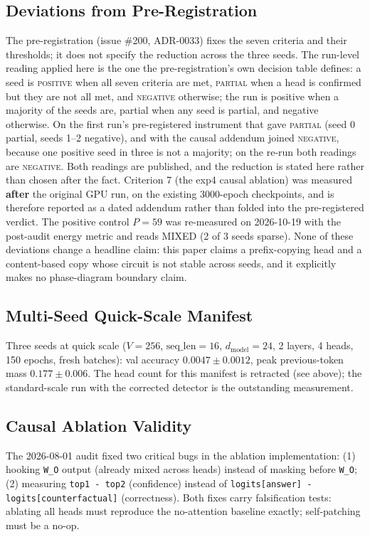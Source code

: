 \documentclass[11pt]{article}
\begin{document}
\subsection{Deviations from Pre-Registration}
The pre-registration (issue \#200, ADR-0033) fixes the seven criteria and
their thresholds; it does not specify the reduction across the three seeds.
The run-level reading applied here is the one the pre-registration's own
decision table defines: a seed is \textsc{positive} when all seven criteria
are met, \textsc{partial} when a head is confirmed but they are not all met,
and \textsc{negative} otherwise; the run is positive when a majority of the
seeds are, partial when any seed is partial, and negative otherwise. On the
first run's pre-registered instrument that gave \textsc{partial} (seed 0 partial, seeds
1--2 negative), and with the causal addendum joined \textsc{negative}, because one
positive seed in three is not a majority; on the re-run both readings are \textsc{negative}. Both readings are
published, and the reduction is stated here rather than chosen after the
fact. Criterion 7 (the exp4 causal ablation) was measured \textbf{after} the
original GPU run, on the existing $3000$-epoch checkpoints, and is therefore
reported as a dated addendum rather than folded into the pre-registered
verdict. The positive control $P=59$ was re-measured on 2026-10-19 with the
post-audit energy metric and reads MIXED (2 of 3 seeds sparse). None of these
deviations change a headline claim: this paper claims a prefix-copying head
and a content-based copy whose circuit is not stable across seeds, and it explicitly makes no
phase-diagram boundary claim.

\subsection{Multi-Seed Quick-Scale Manifest}
Three seeds at quick scale ($V=256$, $\text{seq\_len}=16$,
$d_\text{model}=24$, 2 layers, 4 heads, 150 epochs, fresh batches):
val accuracy $0.0047 \pm 0.0012$, peak previous-token mass
$0.177 \pm 0.006$. The head count for this manifest is retracted (see
above); the standard-scale run with the corrected detector is the
outstanding measurement.

\subsection{Causal Ablation Validity}
The 2026-08-01 audit fixed two critical bugs in the ablation
implementation: (1) hooking \texttt{W\_O} output (already mixed across
heads) instead of masking before \texttt{W\_O}; (2) measuring
\texttt{top1 - top2} (confidence) instead of \texttt{logits[answer] -
logits[counterfactual]} (correctness). Both fixes carry falsification
tests: ablating all heads must reproduce the no-attention baseline
exactly; self-patching must be a no-op.
\end{document}
